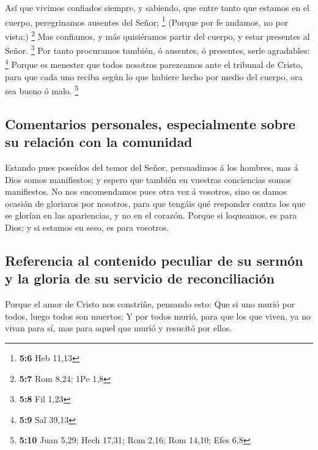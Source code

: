 Así que vivimos confiados siempre, y sabiendo, que entre
tanto que estamos en el cuerpo, peregrinamos ausentes del Señor;
\footnote{\textbf{5:6} Heb 11,13}  (Porque por fe andamos,
no por vista;) \footnote{\textbf{5:7} Rom 8,24; 1Pe 1,8} 
Mas confiamos, y más quisiéramos partir del cuerpo, y estar presentes al
Señor. \footnote{\textbf{5:8} Fil 1,23}  Por tanto
procuramos también, ó ausentes, ó presentes, serle agradables:
\footnote{\textbf{5:9} Sal 39,13}  Porque es menester que
todos nosotros parezcamos ante el tribunal de Cristo, para que cada uno
reciba según lo que hubiere hecho por medio del cuerpo, ora sea bueno ó
malo. \footnote{\textbf{5:10} Juan 5,29; Hech 17,31; Rom 2,16; Rom
  14,10; Efes 6,8}

\hypertarget{comentarios-personales-especialmente-sobre-su-relaciuxf3n-con-la-comunidad}{%
\subsection{Comentarios personales, especialmente sobre su relación con
la
comunidad}\label{comentarios-personales-especialmente-sobre-su-relaciuxf3n-con-la-comunidad}}

 Estando pues poseídos del temor del Señor, persuadimos á
los hombres, mas á Dios somos manifiestos; y espero que también en
vuestras conciencias somos manifiestos.  No nos
encomendamos pues otra vez á vosotros, sino os damos ocasión de
gloriaros por nosotros, para que tengáis qué responder contra los que se
glorían en las apariencias, y no en el corazón.  Porque
si loqueamos, es para Dios; y si estamos en seso, es para vosotros.

\hypertarget{referencia-al-contenido-peculiar-de-su-sermuxf3n-y-la-gloria-de-su-servicio-de-reconciliaciuxf3n}{%
\subsection{Referencia al contenido peculiar de su sermón y la gloria de
su servicio de
reconciliación}\label{referencia-al-contenido-peculiar-de-su-sermuxf3n-y-la-gloria-de-su-servicio-de-reconciliaciuxf3n}}

 Porque el amor de Cristo nos constriñe, pensando esto:
Que si uno murió por todos, luego todos son muertos;  Y
por todos murió, para que los que viven, ya no vivan para sí, mas para
aquel que murió y resucitó por ellos.

